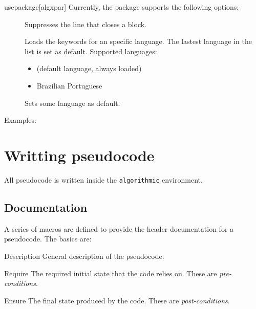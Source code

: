 \documentclass[a4paper, 11pt]{article}
\begin{document}
\begin{macro*}{usepackage}{}[algxpar]
    \bigskip
    Currently, the package supports the following options:

    \begin{description}
        \item[] Suppresses the line that closes a block.
        \item[] Loads the keywords for an specific language. The lastest language in the list is set as default. Supported languages:
        \begin{itemize}
            \item {} (default language, always loaded)
            \item {} Brazilian Portuguese
        \end{itemize}
        \item[] Sets some language as default.
    \end{description}
\end{macro*}

Examples:
\begin{latexcode}
    \usepackage[noend]{algxpar} %

    \usepackage[brazilian]{algxpar} %

    \usepackage[brazilian, language = english]{algxpar}  %
\end{latexcode}


\section{Writting pseudocode}
All pseudocode is written inside the \texttt{algorithmic} environment.

\subsection{Documentation}
A series of macros are defined to provide the header documentation for a pseudocode. The basics are:
\begin{macro}{Description}
    General description of the pseudocode.
\end{macro}
\begin{macro}{Require}
    The required initial state that the code relies on. These are \textit{pre-conditions}.
\end{macro}
\begin{macro}{Ensure}
    The final state produced by the code. These are \textit{post-conditions}.
\end{macro}
\end{document}
